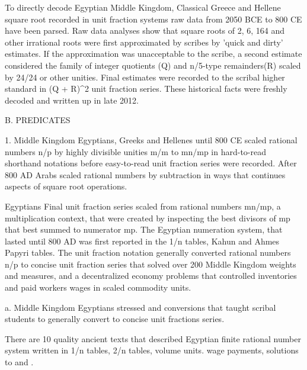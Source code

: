 \documentclass[12pt]{article}
\begin{document}
To directly decode Egyptian Middle Kingdom, Classical Greece and Hellene square root recorded in unit fraction systems raw data from 2050 BCE to 800 CE have been parsed. Raw data analyses show that square roots of 2, 6, 164 and other irrational roots were first approximated by scribes by 'quick and dirty' estimates. If the approximation was unacceptable to the scribe, a second estimate considered the family of integer quotients (Q) and n/5-type remainders(R) scaled by 24/24 or other unities. Final estimates were recorded to the scribal higher standard in (Q + R)^2  unit fraction series. These historical facts were freshly decoded and written up in late 2012.

B. PREDICATES  

1. Middle Kingdom Egyptians, Greeks and Hellenes until 800 CE scaled rational numbers n/p by highly divisible unities m/m to mn/mp in hard-to-read shorthand notations before easy-to-read unit fraction series were recorded. After 800 AD Arabs scaled rational numbers by subtraction in ways that continues aspects of square root operations. 

Egyptians Final unit fraction series scaled from rational numbers mn/mp, a multiplication context, that were created by inspecting the best divisors of mp that best summed to numerator mp. The Egyptian numeration system, that lasted until 800 AD was first reported in the  1/n tables, Kahun and Ahmes Papyri  tables. The unit fraction notation generally converted rational numbers n/p to concise unit fraction series that solved over 200 Middle Kingdom weights and measures, and a decentralized economy problems that controlled inventories and paid workers wages in scaled commodity units.

a. Middle Kingdom Egyptians stressed and  conversions that taught scribal students to generally convert  to concise unit fractions series. 

There are 10 quality ancient texts that described Egyptian finite rational number system written in 1/n tables, 2/n tables, volume units. wage payments, solutions to  and .
\end{document}
